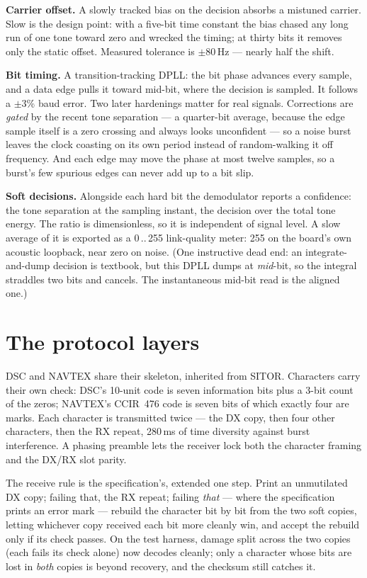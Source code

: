 \textbf{Carrier offset.} A slowly tracked bias on the decision absorbs a
mistuned carrier. Slow is the design point: with a five-bit time constant the
bias chased any long run of one tone toward zero and wrecked the timing; at
thirty bits it removes only the static offset. Measured tolerance is
$\pm$80\,Hz --- nearly half the shift.

\textbf{Bit timing.} A transition-tracking DPLL: the bit phase advances every
sample, and a data edge pulls it toward mid-bit, where the decision is
sampled. It follows a $\pm$3\% baud error. Two later hardenings matter for
real signals. Corrections are \emph{gated} by the recent tone separation --- a
quarter-bit average, because the edge sample itself is a zero crossing and
always looks unconfident --- so a noise burst leaves the clock coasting on its
own period instead of random-walking it off frequency. And each edge may move
the phase at most twelve samples, so a burst's few spurious edges can never
add up to a bit slip.

\textbf{Soft decisions.} Alongside each hard bit the demodulator reports a
confidence: the tone separation at the sampling instant, the decision over the
total tone energy. The ratio is dimensionless, so it is independent of signal
level. A slow average of it is exported as a 0\,..\,255 link-quality meter:
255 on the board's own acoustic loopback, near zero on noise. (One instructive
dead end: an integrate-and-dump decision is textbook, but this DPLL dumps at
\emph{mid}-bit, so the integral straddles two bits and cancels. The
instantaneous mid-bit read is the aligned one.)

\section{The protocol layers}

DSC and NAVTEX share their skeleton, inherited from SITOR. Characters carry
their own check: DSC's 10-unit code is seven information bits plus a 3-bit
count of the zeros; NAVTEX's CCIR~476 code is seven bits of which exactly four
are marks. Each character is transmitted twice --- the DX copy, then four
other characters, then the RX repeat, 280\,ms of time diversity against burst
interference. A phasing preamble lets the receiver lock both the character
framing and the DX/RX slot parity.

The receive rule is the specification's, extended one step. Print an
unmutilated DX copy; failing that, the RX repeat; failing \emph{that} ---
where the specification prints an error mark --- rebuild the character bit by
bit from the two soft copies, letting whichever copy received each bit more
cleanly win, and accept the rebuild only if its check passes. On the test
harness, damage split across the two copies (each fails its check alone) now
decodes cleanly; only a character whose bits are lost in \emph{both} copies is
beyond recovery, and the checksum still catches it.

